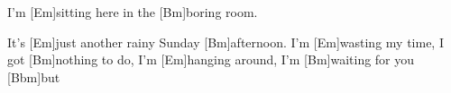 

\hfill{}

\begin{guitar}

	I'm [Em]sitting here in the [Bm]boring room.
\end{guitar}
	
\vspace{-2.875em} \hfill {}
\vspace{-0.125em} 
	
\begin{guitar}
	It's [Em]just another rainy Sunday [Bm]afternoon.
	I'm [Em]wasting my time, I got [Bm]nothing to do,
	I'm [Em]hanging around, I'm [Bm]waiting for you [Bbm]but
\end{guitar}

\vspace{-2.875em} \hfill {}
\vspace{-0.125em} 


